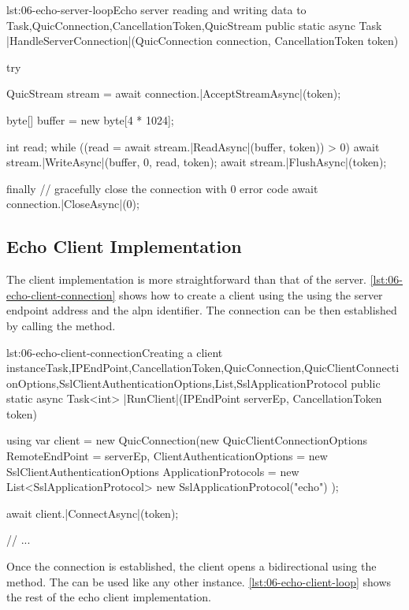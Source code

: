\begin{myListingCsharp}{lst:06-echo-server-loop}{Echo server reading and writing data to \QuicStream{}}{Task,QuicConnection,CancellationToken,QuicStream}{}
public static async Task |HandleServerConnection|(QuicConnection connection,
    CancellationToken token)
{
    try
    {
        QuicStream stream = await connection.|AcceptStreamAsync|(token);

        byte[] buffer = new byte[4 * 1024];

        int read;
        while ((read = await stream.|ReadAsync|(buffer, token)) > 0)
        {
            await stream.|WriteAsync|(buffer, 0, read, token);
            await stream.|FlushAsync|(token);
        }
    }
    finally
    {
        // gracefully close the connection with 0 error code
        await connection.|CloseAsync|(0);
    }
}
\end{myListingCsharp}

\subsection{Echo Client Implementation}

The client implementation is more straightforward than that of the server.
\autoref{lst:06-echo-client-connection} shows how to create a client \QuicConnection{} using the
using the server endpoint address and the \gls{alpn} identifier. The connection can be then
established by calling the  method.

\begin{myListingCsharpNoPageBreak}{lst:06-echo-client-connection}{Creating a client \QuicConnection{} instance}{Task,IPEndPoint,CancellationToken,QuicConnection,QuicClientConnectionOptions,SslClientAuthenticationOptions,List,SslApplicationProtocol}{}
public static async Task<int> |RunClient|(IPEndPoint serverEp,
    CancellationToken token)
{
    using var client = new QuicConnection(new QuicClientConnectionOptions
    {
        RemoteEndPoint = serverEp,
        ClientAuthenticationOptions = new SslClientAuthenticationOptions
        {
            ApplicationProtocols = new List<SslApplicationProtocol>
            {
                new SslApplicationProtocol("echo")
            }
        }
    });

    await client.|ConnectAsync|(token);

    // ...
}
\end{myListingCsharpNoPageBreak}

Once the connection is established, the client opens a bidirectional \QuicStream{} using the
 method. The \QuicStream{} can be used like any other \Stream{}
instance. \autoref{lst:06-echo-client-loop} shows the rest of the echo client implementation.

